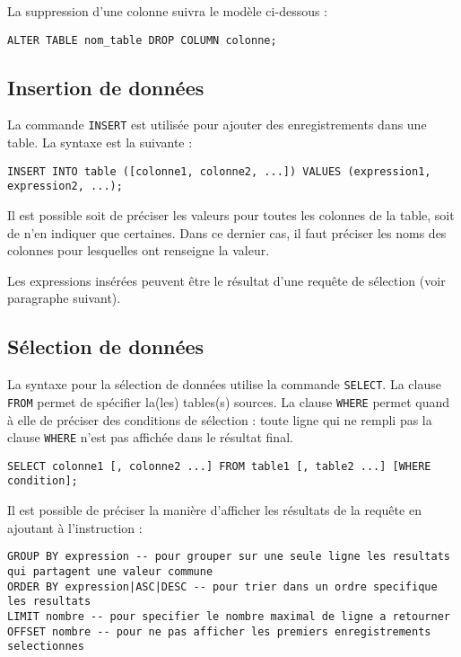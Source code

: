 \documentclass[11pt]{article}
\begin{document}
				La suppression d'une colonne suivra le modèle ci-dessous :
				\begin{lstlisting}
ALTER TABLE nom_table DROP COLUMN colonne;
				\end{lstlisting}

			
			
			\subsection{Insertion de données}
				La commande \lstinline{INSERT} est utilisée pour ajouter des enregistrements dans une table. La syntaxe est la suivante :
				\begin{lstlisting}
INSERT INTO table ([colonne1, colonne2, ...]) VALUES (expression1, expression2, ...);
				\end{lstlisting}
				
				Il est possible soit de préciser les valeurs pour toutes les colonnes de la table, soit de n'en indiquer que certaines. Dans ce dernier cas, il faut préciser les noms des colonnes pour lesquelles ont renseigne la valeur.
				
				Les expressions insérées peuvent être le résultat d'une requête de sélection (voir paragraphe suivant).
				
			
			\subsection{Sélection de données}
				La syntaxe pour la sélection de données utilise la commande \lstinline{SELECT}. La clause \lstinline{FROM} permet de spécifier la(les) tables(s) sources. La clause \lstinline{WHERE} permet quand à elle de préciser des conditions de sélection : toute ligne qui ne rempli pas la clause \lstinline{WHERE} n'est pas affichée dans le résultat final.
				\begin{lstlisting}
SELECT colonne1 [, colonne2 ...] FROM table1 [, table2 ...] [WHERE condition];
				\end{lstlisting}
				
				Il est possible de préciser la manière d'afficher les résultats de la requête en ajoutant à l'instruction :
				\begin{lstlisting}
GROUP BY expression -- pour grouper sur une seule ligne les resultats qui partagent une valeur commune
ORDER BY expression|ASC|DESC -- pour trier dans un ordre specifique les resultats
LIMIT nombre -- pour specifier le nombre maximal de ligne a retourner
OFFSET nombre -- pour ne pas afficher les premiers enregistrements selectionnes
				\end{lstlisting}
				
\end{document}
